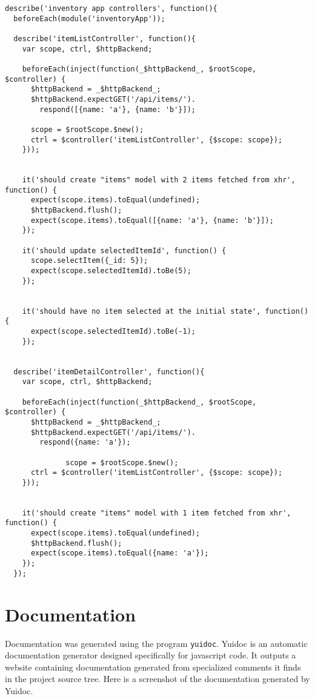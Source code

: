 \documentclass[letterpaper, 12pt]{article}
\begin{document}
\begingroup
    \fontsize{10pt}{12pt}\selectfont
\vspace{-3mm}\begin{verbatim}
describe('inventory app controllers', function(){
  beforeEach(module('inventoryApp'));

  describe('itemListController', function(){
    var scope, ctrl, $httpBackend;

    beforeEach(inject(function(_$httpBackend_, $rootScope, $controller) {
      $httpBackend = _$httpBackend_;
      $httpBackend.expectGET('/api/items/').
        respond([{name: 'a'}, {name: 'b'}]);

      scope = $rootScope.$new();
      ctrl = $controller('itemListController', {$scope: scope});
    }));


    it('should create "items" model with 2 items fetched from xhr', function() {
      expect(scope.items).toEqual(undefined);
      $httpBackend.flush();
      expect(scope.items).toEqual([{name: 'a'}, {name: 'b'}]);
    });

    it('should update selectedItemId', function() {
      scope.selectItem({_id: 5});
      expect(scope.selectedItemId).toBe(5);
    });


    it('should have no item selected at the initial state', function() {
      expect(scope.selectedItemId).toBe(-1);
    });


  describe('itemDetailController', function(){
    var scope, ctrl, $httpBackend;

    beforeEach(inject(function(_$httpBackend_, $rootScope, $controller) {
      $httpBackend = _$httpBackend_;
      $httpBackend.expectGET('/api/items/').
        respond({name: 'a'});

              scope = $rootScope.$new();
      ctrl = $controller('itemListController', {$scope: scope});
    }));


    it('should create "items" model with 1 item fetched from xhr', function() {
      expect(scope.items).toEqual(undefined);
      $httpBackend.flush();
      expect(scope.items).toEqual({name: 'a'});
    });
  });
\end{verbatim}
\endgroup

\section{Documentation}
Documentation was generated using the program \texttt{yuidoc}.  Yuidoc is an automatic documentation generator designed specifically for javascript code.  It outputs a website containing documentation generated from specialized comments it finds in the project source tree. Here is a screenshot of the documentation generated by Yuidoc.
\end{document}
